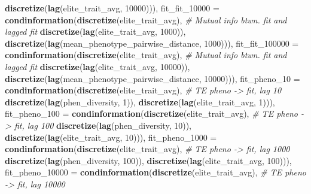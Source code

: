 \documentclass[]{book}
\newenvironment{Shaded}{\begin{snugshade}}{\end{snugshade}}
\newcommand{\CommentTok}[1]{\textcolor[rgb]{0.56,0.35,0.01}{\textit{#1}}}
\newcommand{\DataTypeTok}[1]{\textcolor[rgb]{0.13,0.29,0.53}{#1}}
\newcommand{\DecValTok}[1]{\textcolor[rgb]{0.00,0.00,0.81}{#1}}
\newcommand{\KeywordTok}[1]{\textcolor[rgb]{0.13,0.29,0.53}{\textbf{#1}}}
\newcommand{\NormalTok}[1]{#1}
\begin{document}
\begin{Shaded}
\begin{Highlighting}[]
{                                     \KeywordTok{discretize}\NormalTok{(}\KeywordTok{lag}\NormalTok{(elite_trait_avg, }\DecValTok{10000}\NormalTok{))),  }
  \DataTypeTok{fit_fit_10000 =}    \KeywordTok{condinformation}\NormalTok{(}\KeywordTok{discretize}\NormalTok{(elite_trait_avg), }\CommentTok{# Mutual info btwn. fit and lagged fit}
                                     \KeywordTok{discretize}\NormalTok{(}\KeywordTok{lag}\NormalTok{(elite_trait_avg, }\DecValTok{1000}\NormalTok{)), }
                                     \KeywordTok{discretize}\NormalTok{(}\KeywordTok{lag}\NormalTok{(mean_phenotype_pairwise_distance, }\DecValTok{1000}\NormalTok{))),}
  \DataTypeTok{fit_fit_100000 =}   \KeywordTok{condinformation}\NormalTok{(}\KeywordTok{discretize}\NormalTok{(elite_trait_avg), }\CommentTok{# Mutual info btwn. fit and lagged fit}
                                     \KeywordTok{discretize}\NormalTok{(}\KeywordTok{lag}\NormalTok{(elite_trait_avg, }\DecValTok{10000}\NormalTok{)), }
                                     \KeywordTok{discretize}\NormalTok{(}\KeywordTok{lag}\NormalTok{(mean_phenotype_pairwise_distance, }\DecValTok{10000}\NormalTok{))),  }
  \DataTypeTok{fit_pheno_10 =}     \KeywordTok{condinformation}\NormalTok{(}\KeywordTok{discretize}\NormalTok{(elite_trait_avg), }\CommentTok{# TE pheno -> fit, lag 10}
                                     \KeywordTok{discretize}\NormalTok{(}\KeywordTok{lag}\NormalTok{(phen_diversity, }\DecValTok{1}\NormalTok{)), }
                                     \KeywordTok{discretize}\NormalTok{(}\KeywordTok{lag}\NormalTok{(elite_trait_avg, }\DecValTok{1}\NormalTok{))),}
  \DataTypeTok{fit_pheno_100 =}    \KeywordTok{condinformation}\NormalTok{(}\KeywordTok{discretize}\NormalTok{(elite_trait_avg),  }\CommentTok{# TE pheno -> fit, lag 100 }
                                     \KeywordTok{discretize}\NormalTok{(}\KeywordTok{lag}\NormalTok{(phen_diversity, }\DecValTok{10}\NormalTok{)), }
                                     \KeywordTok{discretize}\NormalTok{(}\KeywordTok{lag}\NormalTok{(elite_trait_avg, }\DecValTok{10}\NormalTok{))),}
  \DataTypeTok{fit_pheno_1000 =}   \KeywordTok{condinformation}\NormalTok{(}\KeywordTok{discretize}\NormalTok{(elite_trait_avg),  }\CommentTok{# TE pheno -> fit, lag 1000}
                                     \KeywordTok{discretize}\NormalTok{(}\KeywordTok{lag}\NormalTok{(phen_diversity, }\DecValTok{100}\NormalTok{)), }
                                     \KeywordTok{discretize}\NormalTok{(}\KeywordTok{lag}\NormalTok{(elite_trait_avg, }\DecValTok{100}\NormalTok{))),}
  \DataTypeTok{fit_pheno_10000 =}  \KeywordTok{condinformation}\NormalTok{(}\KeywordTok{discretize}\NormalTok{(elite_trait_avg),  }\CommentTok{# TE pheno -> fit, lag 10000}
}
\end{Highlighting}
\end{Shaded}
\end{document}
